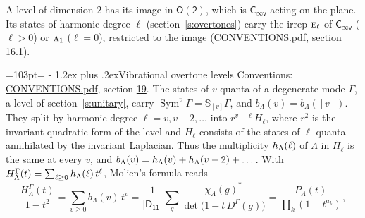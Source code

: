 \documentclass[10pt,a4paper]{article}
\makeatletter
\renewcommand\section{\@startsection{section}{1}{\z@}{-3ex plus -1ex minus -.2ex}%
  {1.2ex plus .2ex}{\normalfont\large\sffamily\bfseries\color{parttitle}}}
\newcommand{\needspace}[1]{\par\penalty-100\begingroup\dimen0=#1\relax\dimen2=\pagegoal
  \advance\dimen2-\pagetotal\ifdim\dimen0>\dimen2\relax\ifdim\dimen2>0pt\vfil\break\fi\fi
  \endgroup}
\numberwithin{equation}{section}
\newcommand{\grp}[1]{\mathsf{#1}}
\newcommand{\irr}[1]{\text{\normalfont\scshape #1}}
\newcommand{\repD}[1]{D^{#1}}
\newcommand{\irchar}[1]{\chi_{#1}}
\newcommand{\conj}[1]{{#1}^{*}}
\newcommand{\schur}[1]{\mathbb{S}_{#1}}
\newcommand{\shape}[1]{[#1]}
\makeatother
\begin{document}
A level of dimension 2 has its image in $\grp{O(2)}$, which is \href{Cinfv.pdf}{$\grp{C_{\infty v}}$} acting on the plane. \label{n:index.harmonic.degree}Its states of harmonic degree $\ell$ (section~\ref{s:overtones}) carry the irrep $\irr{e}_{\ell}$ of \href{Cinfv.pdf}{$\grp{C_{\infty v}}$} ($\ell > 0$) or $\irr{a}_{1}$ ($\ell = 0$), restricted to the image (\href{../../CONVENTIONS.pdf}{CONVENTIONS.pdf}, section \href{../../CONVENTIONS.pdf\#conv.16.1}{16.1}).
\needspace{103pt}
\section{Vibrational overtone levels}\label{s:overtones}
Conventions: \href{../../CONVENTIONS.pdf}{CONVENTIONS.pdf}, section \href{../../CONVENTIONS.pdf\#conv.19}{19}.
\leavevmode\label{n:index.quanta}\label{n:operator.symmetric.power}The states of $v$ quanta of a degenerate mode $\Gamma$, a level of section~\ref{s:unitary}, carry $\operatorname{Sym}^{v}\Gamma = \schur{\shape{v}}\Gamma$, and $b_\Lambda(v) = b_\Lambda(\shape{v})$. \label{n:local.quadratic.form}\label{n:set.harmonic}They split by harmonic degree $\ell = v, v - 2, \dots$ into $r^{v-\ell}H_\ell$, where $r^2$ is the invariant quadratic form of the level and $H_\ell$ consists of the states of $\ell$ quanta annihilated by the invariant Laplacian. \label{n:function.multiplicity.harmonic}Thus the multiplicity $\mathnormal{h}_\Lambda(\ell)$ of $\Lambda$ in $H_\ell$ is the same at every $v$, and $b_\Lambda(v) = \mathnormal{h}_\Lambda(v) + \mathnormal{h}_\Lambda(v - 2) + \dots$. \label{n:function.generating.level}With $H^{\Gamma}_\Lambda(t) = \sum_{\ell\ge0} \mathnormal{h}_\Lambda(\ell)\,t^{\ell}$, Molien's formula reads
\begin{equation}\label{e:molien}\frac{H^{\Gamma}_\Lambda(t)}{1 - t^2} = \sum_{v\ge0} b_\Lambda(v)\,t^v = \frac{1}{|\grp{D_{11}}|}\sum_{g}\frac{\conj{\irchar{\Lambda}(g)}}{\det\bigl(1 - t\,\repD{\Gamma}(g)\bigr)} = \frac{P_\Lambda(t)}{\prod_k (1-t^{a_k})},\end{equation}
\end{document}
